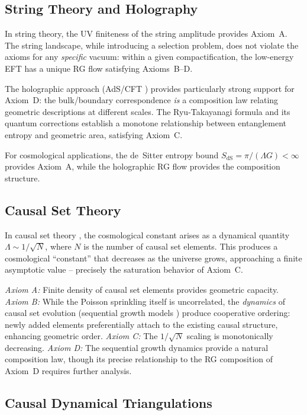 \documentclass[aps,prd,twocolumn,superscriptaddress,nofootinbib]{revtex4-2}
\begin{document}
\subsection{String Theory and Holography}

In string theory, the UV finiteness of the string amplitude provides Axiom~A. The string landscape, while introducing a selection problem, does not violate the axioms for any \textit{specific} vacuum: within a given compactification, the low-energy EFT has a unique RG flow satisfying Axioms~B--D.

The holographic approach (AdS/CFT \cite{Maldacena1999}) provides particularly strong support for Axiom~D: the bulk/boundary correspondence \textit{is} a composition law relating geometric descriptions at different scales. The Ryu-Takayanagi formula \cite{Ryu2006} and its quantum corrections establish a monotone relationship between entanglement entropy and geometric area, satisfying Axiom~C.

For cosmological applications, the de~Sitter entropy bound $S_{\mathrm{dS}} = \pi/(\Lambda G) < \infty$ provides Axiom~A, while the holographic RG flow \cite{deBoer2000} provides the composition structure.

\subsection{Causal Set Theory}

In causal set theory \cite{Sorkin2003,Surya2019}, the cosmological constant arises as a dynamical quantity $\Lambda \sim 1/\sqrt{N}$, where $N$ is the number of causal set elements. This produces a cosmological ``constant'' that decreases as the universe grows, approaching a finite asymptotic value -- precisely the saturation behavior of Axiom~C.

\textit{Axiom A:} Finite density of causal set elements provides geometric capacity. \textit{Axiom B:} While the Poisson sprinkling itself is uncorrelated, the \textit{dynamics} of causal set evolution (sequential growth models \cite{Surya2019}) produce cooperative ordering: newly added elements preferentially attach to the existing causal structure, enhancing geometric order. \textit{Axiom C:} The $1/\sqrt{N}$ scaling is monotonically decreasing. \textit{Axiom D:} The sequential growth dynamics provide a natural composition law, though its precise relationship to the RG composition of Axiom~D requires further analysis.

\subsection{Causal Dynamical Triangulations}
\end{document}
